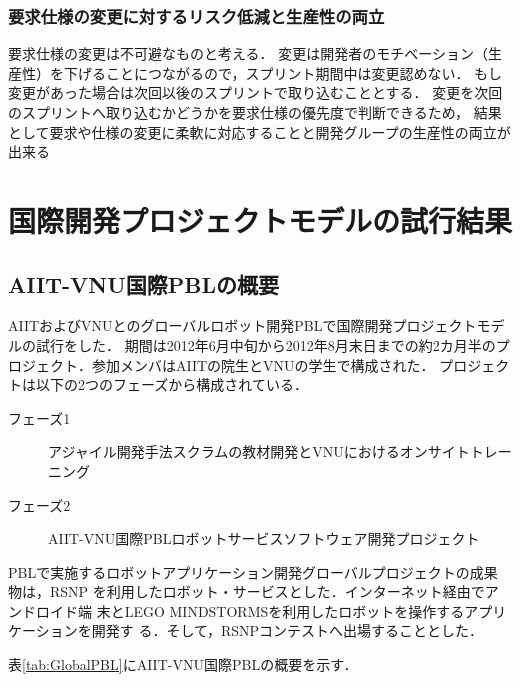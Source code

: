 \documentclass[a4j, 12Q, twocolumn, twoside]{jsarticle}
\begin{document}
\subsubsection{要求仕様の変更に対するリスク低減と生産性の両立}
要求仕様の変更は不可避なものと考える．
変更は開発者のモチベーション（生産性）を下げることにつながるので，スプリント期間中は変更認めない．
もし変更があった場合は次回以後のスプリントで取り込むこととする．
変更を次回のスプリントへ取り込むかどうかを要求仕様の優先度で判断できるため，
結果として要求や仕様の変更に柔軟に対応することと開発グループの生産性の両立が出来る


\section{国際開発プロジェクトモデルの試行結果}\label{sec:result}
\subsection{AIIT-VNU国際PBLの概要}
AIITおよびVNUとのグローバルロボット開発PBLで国際開発プロジェクトモデルの試行をした．
期間は2012年6月中旬から2012年8月末日までの約2カ月半のプロジェクト．参加メンバはAIITの院生とVNUの学生で構成された．
プロジェクトは以下の2つのフェーズから構成されている．

\begin{description}
\item[フェーズ1] アジャイル開発手法スクラムの教材開発とVNUにおけるオンサイトトレーニング
\item[フェーズ2] AIIT-VNU国際PBLロボットサービスソフトウェア開発プロジェクト
\end{description}

PBLで実施するロボットアプリケーション開発グローバルプロジェクトの成果
物は，RSNP
\cite{narita2011enhanced,kato2011rsi}
を利用したロボット・サービスとした．インターネット経由でアンドロイド端
末とLEGO MINDSTORMSを利用したロボットを操作するアプリケーションを開発す
る．そして，RSNPコンテストへ出場することとした．

表\ref{tab:GlobalPBL}にAIIT-VNU国際PBLの概要を示す．
\end{document}
